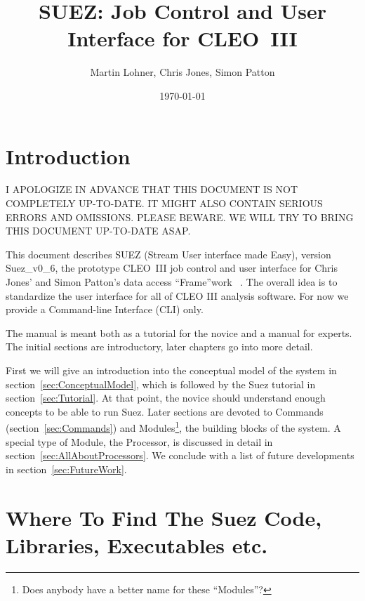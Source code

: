 \documentclass[12pt]{article}
\title{SUEZ: Job Control and User Interface for \mbox{CLEO III}}
\author{Martin Lohner, Chris Jones, Simon Patton}
\date{\today}
\def\SuezVersion{Suez\_v0\_6}
\begin{document}
\maketitle

\tableofcontents

\section{Introduction}
\label{sec:Introduction}

I APOLOGIZE IN ADVANCE THAT THIS DOCUMENT IS NOT COMPLETELY UP-TO-DATE.
IT MIGHT ALSO CONTAIN SERIOUS ERRORS AND OMISSIONS. PLEASE BEWARE. WE
WILL TRY TO BRING THIS DOCUMENT UP-TO-DATE ASAP.

This document describes SUEZ (Stream User interface made Easy), version
\SuezVersion{}, the prototype \mbox{CLEO III} job control
and user interface for Chris Jones' and Simon Patton's data access
``Frame''work~\cite{Delivery} . The overall idea is to
standardize the user interface for all of CLEO III analysis software.
For now we provide a Command-line Interface (CLI) only.

The manual is meant both as a tutorial for the novice and a manual for
experts. The initial sections are introductory, later chapters go into
more detail.

First we will give an introduction into the conceptual model of the
system in section~\ref{sec:ConceptualModel}, which is followed by the
Suez tutorial in section~\ref{sec:Tutorial}. At that point, the novice
should understand enough concepts to be able to run Suez. Later sections
are devoted to Commands (section~\ref{sec:Commands}) and
Modules\footnote{Does anybody have a better name for these ``Modules''?},
the building blocks of the system. A
special type of Module, the Processor, is discussed in detail in
section~\ref{sec:AllAboutProcessors}. We conclude with a list of future
developments in section~\ref{sec:FutureWork}.


\section{Where To Find The Suez Code, Libraries, Executables etc.}
\label{sec:Code}
\end{document}
